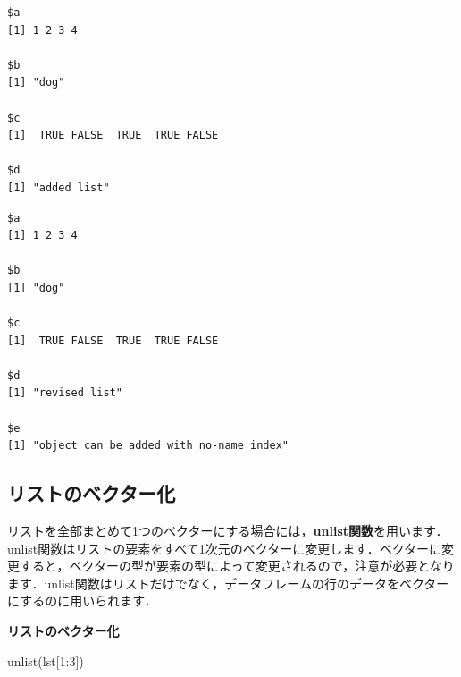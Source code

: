 \documentclass[
  letterpaper,
  DIV=11,
  numbers=noendperiod]{scrreprt}
\newenvironment{Shaded}{\begin{snugshade}}{\end{snugshade}}
\newcommand{\CommentTok}[1]{\textcolor[rgb]{0.37,0.37,0.37}{#1}}
\newcommand{\DecValTok}[1]{\textcolor[rgb]{0.68,0.00,0.00}{#1}}
\newcommand{\FunctionTok}[1]{\textcolor[rgb]{0.28,0.35,0.67}{#1}}
\newcommand{\NormalTok}[1]{\textcolor[rgb]{0.00,0.23,0.31}{#1}}
\newcommand{\OtherTok}[1]{\textcolor[rgb]{0.00,0.23,0.31}{#1}}
\newcommand{\SpecialCharTok}[1]{\textcolor[rgb]{0.37,0.37,0.37}{#1}}
\newcommand{\StringTok}[1]{\textcolor[rgb]{0.13,0.47,0.30}{#1}}
\begin{document}
\begin{verbatim}
$a
[1] 1 2 3 4

$b
[1] "dog"

$c
[1]  TRUE FALSE  TRUE  TRUE FALSE

$d
[1] "added list"
\end{verbatim}

\begin{Shaded}
\end{Shaded}

\begin{verbatim}
$a
[1] 1 2 3 4

$b
[1] "dog"

$c
[1]  TRUE FALSE  TRUE  TRUE FALSE

$d
[1] "revised list"

$e
[1] "object can be added with no-name index"
\end{verbatim}

\hypertarget{ux30eaux30b9ux30c8ux306eux30d9ux30afux30bfux30fcux5316}{%
\subsection{リストのベクター化}\label{ux30eaux30b9ux30c8ux306eux30d9ux30afux30bfux30fcux5316}}

リストを全部まとめて1つのベクターにする場合には，\textbf{unlist関数}を用います．unlist関数はリストの要素をすべて1次元のベクターに変更します．ベクターに変更すると，ベクターの型が要素の型によって変更されるので，注意が必要となります．unlist関数はリストだけでなく，データフレームの行のデータをベクターにするのに用いられます．

\textbf{リストのベクター化}

\begin{Shaded}
\begin{Highlighting}[]
\FunctionTok{unlist}\NormalTok{(lst[}\DecValTok{1}\SpecialCharTok{:}\DecValTok{3}\NormalTok{])}
\end{Highlighting}
\end{Shaded}
\end{document}
